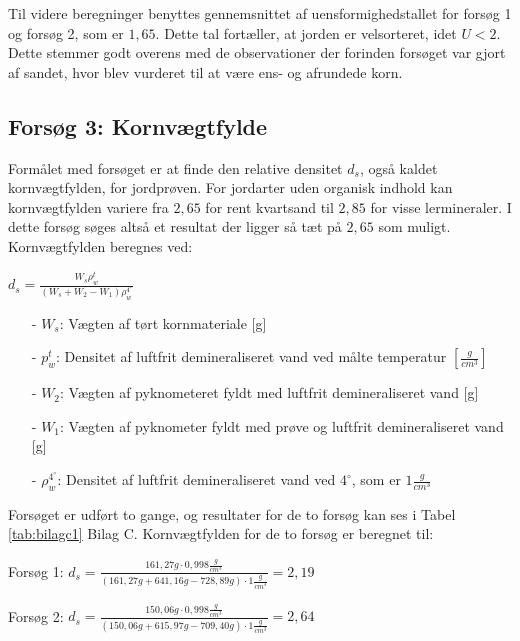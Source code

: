Til videre beregninger benyttes gennemsnittet af uensformighedstallet for forsøg 1 og forsøg 2, som er $1,\!65$. Dette tal fortæller, at jorden er velsorteret, idet $U<2$. Dette stemmer godt overens med de observationer der forinden forsøget var gjort af sandet, hvor blev vurderet til at være ens- og afrundede korn. 

\subsection{Forsøg 3: Kornvægtfylde}
Formålet med forsøget er at finde den relative densitet $d_s$, også kaldet kornvægtfylden, for jordprøven. For jordarter uden organisk indhold kan kornvægtfylden variere fra $2,\!65$ for rent kvartsand til $2,\!85$ for visse lermineraler. I dette forsøg søges altså et resultat der ligger så tæt på $2,\!65$ som muligt.
\newline
\newline
Kornvægtfylden beregnes ved:

\begin{center}
	$d_s = \frac{W_s \rho_w^t}{(W_s + W_2 - W_1)\rho_w^{4^{\circ}}}$
\end{center}

\begin{itemize}
	\item[-] $W_s$: Vægten af tørt kornmateriale [g]
	\item[-] $p_w^t$: Densitet af luftfrit demineraliseret vand ved målte temperatur $[\frac{g}{cm^3}]$
	\item[-] $W_2$: Vægten af pyknometeret fyldt med luftfrit demineraliseret vand [g]
	\item[-] $W_1$: Vægten af pyknometer fyldt med prøve og luftfrit demineraliseret vand [g]
	\item[-] $\rho_w^{4^{\circ}}$: Densitet af luftfrit demineraliseret vand ved $4^{\circ}$, som er $1 \frac{g}{cm^3}$
\end{itemize}

Forsøget er udført to gange, og resultater for de to forsøg kan ses i Tabel \ref{tab:bilagc1} Bilag C. Kornvægtfylden for de to forsøg er beregnet til:

\begin{center}
	Forsøg 1: $d_{s} = \frac{161,\!27 g \cdot 0,\!998 \frac{g}{cm^3}}{(161,\!27 g + 641,\!16 g - 728,\!89 g)\cdot 1 \frac{g}{cm^3}} = 2,\!19$
\end{center}
\begin{center}
	Forsøg 2: $d_{s} = \frac{150,\!06 g \cdot 0,\!998 \frac{g}{cm^3}}{(150,\!06 g + 615,\!97 g - 709,\!40 g)\cdot 1 \frac{g}{cm^3}} = 2,\!64$
\end{center} 

